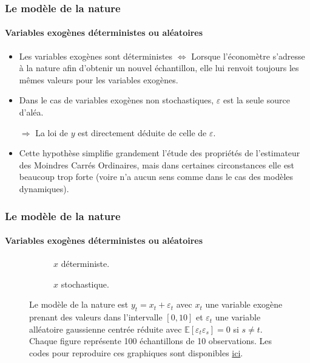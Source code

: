 \documentclass[10pt]{beamer}
\theoremstyle{plain}
\begin{document}
\begin{frame}
  \frametitle{Le modèle de la nature}
  \framesubtitle{Variables exogènes déterministes ou aléatoires}

  \begin{itemize}

  \item Les variables exogènes sont déterministes $\Leftrightarrow$
    Lorsque l'économètre s'adresse à la nature afin d'obtenir un
    nouvel échantillon, elle lui renvoit toujours les mêmes valeurs
    pour les variables exogènes.\newline

  \item Dans le cas de variables exogènes non
    stochastiques, $\varepsilon$ est la seule source d'aléa.\newline

  \item[$\Rightarrow$] La loi de $y$ est directement déduite de celle de $\varepsilon$.\newline

  \item Cette hypothèse simplifie grandement l'étude des propriétés de
    l'estimateur des Moindres Carrés Ordinaires, mais dans certaines
    circonstances elle est beaucoup trop forte (voire n'a aucun sens
    comme dans le cas des modèles dynamiques).\newline

  \end{itemize}

\end{frame}


\begin{frame}
  \frametitle{Le modèle de la nature}
  \framesubtitle{Variables exogènes déterministes ou aléatoires}

  \begin{figure}
    \centering
    \begin{subfigure}{0.4\textwidth}
      \scalebox{.3}{
    }
    \caption{$x$ déterministe.}
    \label{fig:01:a}
  \end{subfigure}
  \hfill
  \begin{subfigure}{0.4\textwidth}
    \scalebox{.3}{
    }
    \caption{$x$ stochastique.}
    \label{fig:01:b}
  \end{subfigure}
  \label{fig:01}
  \caption{Le modèle de la nature est $y_t = x_t + \varepsilon_t$ avec $x_t$ une variable exogène prenant des valeurs dans l'intervalle $[0,10]$ et $\varepsilon_t$ une variable alléatoire gaussienne centrée réduite avec $\mathbb E[\varepsilon_t\varepsilon_s]=0$ si $s\neq t$. Chaque figure représente 100 échantillons de 10 observations. Les codes pour reproduire ces graphiques sont disponibles \href{https://mnemosyne.ithaca.fr/stephane/econometrics/-/blob/\HEAD/cours/codes/chapitre-1/deterministic-versus-stochastic-samples.py}{ici}.}
\end{figure}
\end{frame}
\end{document}
